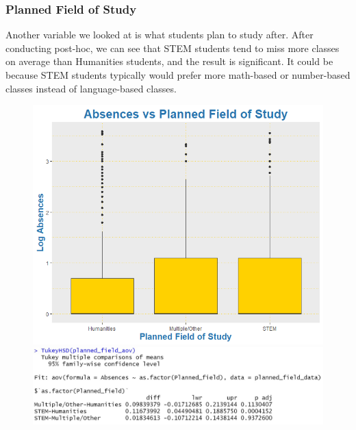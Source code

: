 \documentclass[12pt,letterpaper]{article}
\begin{document}
\subsubsection{Planned Field of Study}

Another variable we looked at is what students plan to study after. After conducting post-hoc, we can see that STEM students tend to miss more classes on average than Humanities students, and the result is significant. It could be because STEM students typically would prefer more math-based or number-based classes instead of language-based classes.

\begin{figure}[!ht]
  \centering
  \begin{minipage}[b]{0.49\textwidth}
    \includegraphics[width=\textwidth]{Plots/5. Planned Field.png}
  \end{minipage}
  \hfill
  \begin{minipage}[b]{0.49\textwidth}
    \includegraphics[width=\textwidth]{Plots/5. Planned Field Tukey.jpg}
  \end{minipage}
\end{figure}
\end{document}
